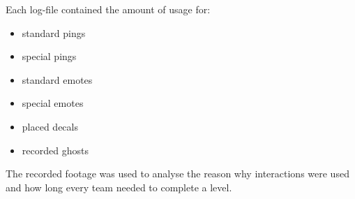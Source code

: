 Each log-file contained the amount of usage for:
\begin{itemize}
    \item standard pings
    \item special pings
    \item standard emotes
    \item special emotes
    \item placed decals
    \item recorded ghosts
\end{itemize}

The recorded footage was used to analyse the reason why interactions were used and how long every team needed to complete a level.